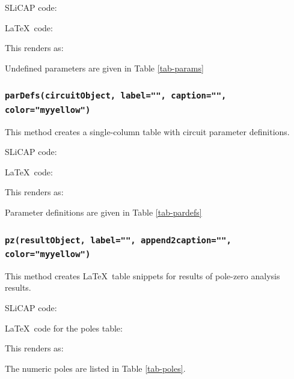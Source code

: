\documentclass[a4paper,12pt]{article}
\begin{document}
SLiCAP code:



\LaTeX$\,$ code:



This renders as:

Undefined parameters are given in Table \ref{tab-params}



\subsubsection{\texttt{parDefs(circuitObject, label="", caption="", color="myyellow")}}

This method creates a single-column table with circuit parameter definitions.

SLiCAP code:



\LaTeX$\,$ code:



This renders as:

Parameter definitions are given in Table \ref{tab-pardefs}



\subsubsection{\texttt{pz(resultObject, label="", append2caption="", \\ color="myyellow")}}

This method creates \LaTeX$\,$ table snippets for results of pole-zero analysis results.

SLiCAP code:



\LaTeX$\,$ code for the poles table:



This renders as:

The numeric poles are listed in Table \ref{tab-poles}.
\end{document}
